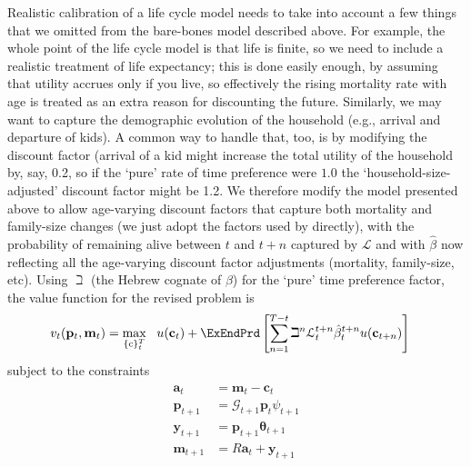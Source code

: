 \documentclass[titlepage, headings=optiontotocandhead]{Resources/texmf-local/tex/latex/econtex}
\begin{document}
Realistic calibration of a life cycle model needs to take into account a few things that we omitted from the bare-bones model described above. For example, the whole point of the life cycle model is that life is finite, so we need to include a realistic treatment of life expectancy; this is done easily enough, by assuming that utility accrues only if you live, so effectively the rising mortality rate with age is treated as an extra reason for discounting the future.  Similarly, we may want to capture the demographic evolution of the household (e.g., arrival and departure of kids).  A common way to handle that, too, is by modifying the discount factor (arrival of a kid might increase the total utility of the household by, say, 0.2, so if the `pure' rate of time preference were $1.0$ the `household-size-adjusted' discount factor might be 1.2.  We therefore modify the model presented above to allow age-varying discount factors that capture both mortality and family-size changes (we just adopt the factors used by \cite{cagettiWprofiles} directly), with the probability of remaining alive between $t$ and $t+n$ captured by $\mathcal{L}$ and with $\hat{\beta}$ now reflecting all the age-varying discount factor adjustments (mortality, family-size, etc).  Using $\beth$ (the Hebrew cognate of $\beta$) for the `pure' time preference factor, the value function for the revised problem is
  \begin{equation}\begin{gathered}\begin{aligned}
        v_{t}(\mathbf{p}_{t},\mathbf{m}_{t}) & =    \max_{\{\mathrm{c}\}_{t}^{T}}~~ u(\mathbf{c}_{t})+\ExEndPrd\left[\sum_{n=1}^{T-t}\beth^{n} \mathcal{L}_{t}^{t+n}\hat{\beta}_{t}^{t+n} u(\mathbf{c}_{t+n}) \right]   \label{eq:lifecyclemax}
      \end{aligned}\end{gathered}  \end{equation}
subject to the constraints
  \begin{equation*}\begin{gathered}\begin{aligned}
        \mathbf{a}_{t}  & = \mathbf{m}_{t}-\mathbf{c}_{t}
        \\      \mathbf{p}_{t+1}  & = \mathcal{G}_{t+1}\mathbf{p}_{t}\psi_{t+1}
        \\      \mathbf{y}_{t+1}  & = \mathbf{p}_{t+1}\pmb{\theta} _{t+1}
        \\      \mathbf{m}_{t+1}  & = R \mathbf{a}_{t}+\mathbf{y}_{t+1}
      \end{aligned}\end{gathered}\end{equation*}
\end{document}
